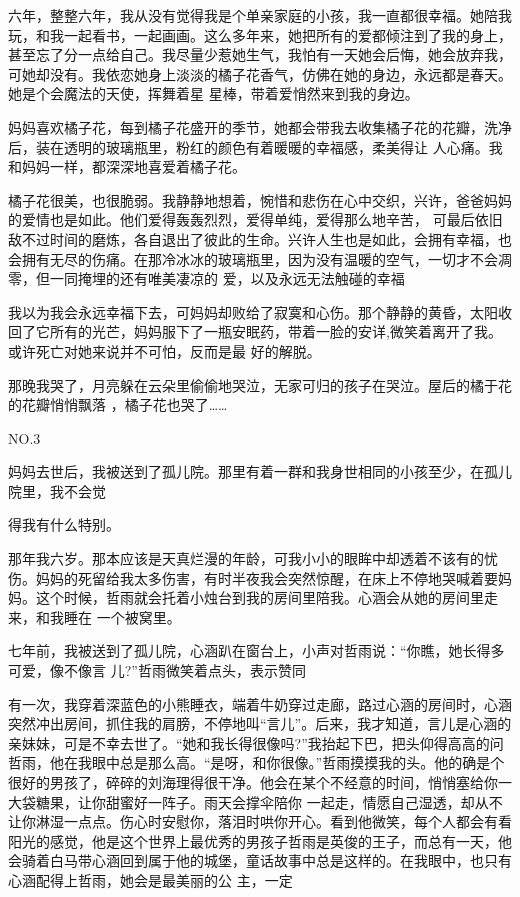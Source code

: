 \documentclass{article}
\begin{document}
六年，整整六年，我从没有觉得我是个单亲家庭的小孩，我一直都很幸福。她陪我玩，和我一起看书，一起画画。这么多年来，她把所有的爱都倾注到了我的身上，甚至忘了分一点给自己。我尽量少惹她生气，我怕有一天她会后悔，她会放弃我，可她却没有。我依恋她身上淡淡的橘子花香气，仿佛在她的身边，永远都是春天。她是个会魔法的天使，挥舞着星
星棒，带着爱悄然来到我的身边。 

妈妈喜欢橘子花，每到橘子花盛开的季节，她都会带我去收集橘子花的花瓣，洗净后，装在透明的玻璃瓶里，粉红的颜色有着暖暖的幸福感，柔美得让
人心痛。我和妈妈一样，都深深地喜爱着橘子花。 

橘子花很美，也很脆弱。我静静地想着，惋惜和悲伤在心中交织，兴许，爸爸妈妈的爱情也是如此。他们爱得轰轰烈烈，爱得单纯，爱得那么地辛苦，
\newpage
可最后依旧敌不过时间的磨炼，各自退出了彼此的生命。兴许人生也是如此，会拥有幸福，也会拥有无尽的伤痛。在那冷冰冰的玻璃瓶里，因为没有温暖的空气，一切才不会凋零，但一同掩埋的还有唯美凄凉的
爱，以及永远无法触碰的幸福 

我以为我会永远幸福下去，可妈妈却败给了寂寞和心伤。那个静静的黄昏，太阳收回了它所有的光芒，妈妈服下了一瓶安眠药，带着一脸的安详,微笑着离开了我。或许死亡对她来说并不可怕，反而是最
好的解脱。 

那晚我哭了，月亮躲在云朵里偷偷地哭泣，无家可归的孩子在哭泣。屋后的橘于花的花瓣悄悄飘落
，橘子花也哭了…… 


NO.3 

妈妈去世后，我被送到了孤儿院。那里有着一群和我身世相同的小孩至少，在孤儿院里，我不会觉

\newpage
得我有什么特别。 

那年我六岁。那本应该是天真烂漫的年龄，可我小小的眼眸中却透着不该有的忧伤。妈妈的死留给我太多伤害，有时半夜我会突然惊醒，在床上不停地哭喊着要妈妈。这个时候，哲雨就会托着小烛台到我的房间里陪我。心涵会从她的房间里走来，和我睡在
一个被窝里。 

七年前，我被送到了孤儿院，心涵趴在窗台上，小声对哲雨说：“你瞧，她长得多可爱，像不像言
儿?”哲雨微笑着点头，表示赞同 

有一次，我穿着深蓝色的小熊睡衣，端着牛奶穿过走廊，路过心涵的房间时，心涵突然冲出房间，抓住我的肩膀，不停地叫“言儿”。后来，我才知道，言儿是心涵的亲妹妹，可是不幸去世了。“她和我长得很像吗?”我抬起下巴，把头仰得高高的问哲雨，他在我眼中总是那么高。“是呀，和你很像。”哲雨摸摸我的头。他的确是个很好的男孩了，碎碎的刘海理得很干净。他会在某个不经意的时间，悄悄塞给你一大袋糖果，让你甜蜜好一阵子。雨天会撑伞陪你
\newpage
一起走，情愿自己湿透，却从不让你淋湿一点点。伤心时安慰你，落泪时哄你开心。看到他微笑，每个人都会有看阳光的感觉，他是这个世界上最优秀的男孩子哲雨是英俊的王子，而总有一天，他会骑着白马带心涵回到属于他的城堡，童话故事中总是这样的。在我眼中，也只有心涵配得上哲雨，她会是最美丽的公
主，一定 
\end{document}
